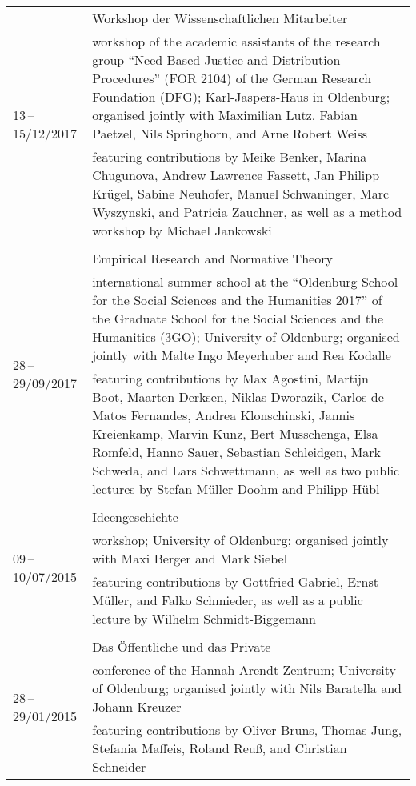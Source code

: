 \documentclass[a4paper,10pt]{article}
\begin{document}
\begin{longtable}{p{2.5cm}p{11cm}}
\multirow{3}{2.5cm}{\footnotesize{13\,--\,15/12/2017}} & Workshop der Wissenschaftlichen Mitarbeiter\\
& \footnotesize{workshop of the academic assistants of the research group \enquote{Need-Based Justice and Distribution Procedures} (FOR 2104) of the German Research Foundation (DFG); Karl-Jaspers-Haus in Oldenburg; organised jointly with Maximilian Lutz, Fabian Paetzel, Nils Springhorn, and Arne Robert Weiss}\\
& \footnotesize{featuring contributions by Meike Benker, Marina Chugunova, Andrew Lawrence Fassett, Jan Philipp Krügel, Sabine Neuhofer, Manuel Schwaninger, Marc Wyszynski, and Patricia Zauchner, as well as a method workshop by Michael Jankowski}\\
\\
\multirow{3}{2.5cm}{\footnotesize{28\,--\,29/09/2017}} & Empirical Research and Normative Theory\\
& \footnotesize{international summer school at the \enquote{Oldenburg School for the Social Sciences and the Humanities 2017} of the Graduate School for the Social Sciences and the Humanities (3GO); University of Oldenburg; organised jointly with Malte Ingo Meyerhuber and Rea Kodalle}\\
& \footnotesize{featuring contributions by Max Agostini, Martijn Boot, Maarten Derksen, Niklas Dworazik, Carlos de Matos Fernandes, Andrea Klonschinski, Jannis Kreienkamp, Marvin Kunz, Bert Musschenga, Elsa Romfeld, Hanno Sauer, Sebastian Schleidgen, Mark Schweda, and Lars Schwettmann, as well as two public lectures by Stefan Müller-Doohm and Philipp Hübl}\\
\\
\multirow{3}{2.5cm}{\footnotesize{09\,--\,10/07/2015}} & Ideengeschichte\\
& \footnotesize{workshop; University of Oldenburg; organised jointly with Maxi Berger and Mark Siebel}\\
& \footnotesize{featuring contributions by Gottfried Gabriel, Ernst Müller, and Falko Schmieder, as well as a public lecture by Wilhelm Schmidt-Biggemann}\\
\\
\multirow{3}{2.5cm}{\footnotesize{28\,--\,29/01/2015}} & Das Öffentliche und das Private\\
& \footnotesize{conference of the Hannah-Arendt-Zentrum; University of Oldenburg; organised jointly with Nils Baratella and Johann Kreuzer}\\
& \footnotesize{featuring contributions by Oliver Bruns, Thomas Jung, Stefania Maffeis, Roland Reuß, and Christian Schneider}\\
\end{longtable}
\end{document}
